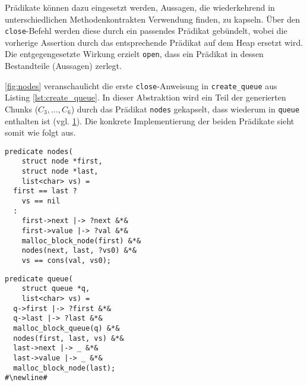 Prädikate können dazu eingesetzt werden, Aussagen, die wiederkehrend in unterschiedlichen Methodenkontrakten Verwendung finden, zu kapseln. Über den \texttt{close}-Befehl werden diese durch ein passendes Prädikat gebündelt, wobei die vorherige Assertion durch das entsprechende Prädikat auf dem Heap ersetzt wird. Die entgegengesetzte Wirkung erzielt \texttt{open}, dass ein Prädikat in dessen Bestandteile (Aussagen) zerlegt. \cite{Jacobs2008,Jacobs2017}

\begin{figure}[hbt!]
	\centering
	\begin{minipage}{.45\textwidth}
		\centering
		
		\label{fig:nodes}
	\end{minipage}
	\hfill
	\begin{minipage}{.45\textwidth}
		\centering
		
		\label{fig:queue}
	\end{minipage}
\end{figure}

\noindent
\cref{fig:nodes} veranschaulicht die erste \texttt{close}-Anweisung in \texttt{create\_queue} aus Listing \ref{lst:create_queue}. In dieser Abstraktion wird ein Teil der generierten Chunks ($C_{3},\ldots,C_{6}$) durch das Prädikat \texttt{nodes} gekapselt, dass wiederum in \texttt{queue} enthalten ist (vgl. \cref{fig:queue}). Die konkrete Implementierung der beiden Prädikate sieht somit wie folgt aus.

\noindent
\begin{minipage}{.45\textwidth}
\begin{lstlisting}
predicate nodes(
    struct node *first,
    struct node *last,
    list<char> vs) =
  first == last ?
    vs == nil
  :
    first->next |-> ?next &*&
    first->value |-> ?val &*&
    malloc_block_node(first) &*&
    nodes(next, last, ?vs0) &*&
    vs == cons(val, vs0);
\end{lstlisting}
\end{minipage}
\hfill
\begin{minipage}{.45\textwidth}
\begin{lstlisting}
predicate queue(
    struct queue *q,
    list<char> vs) =
  q->first |-> ?first &*&
  q->last |-> ?last &*&
  malloc_block_queue(q) &*&
  nodes(first, last, vs) &*&
  last->next |-> _ &*&
  last->value |-> _ &*&
  malloc_block_node(last);
#\newline#
\end{lstlisting}
\end{minipage}


